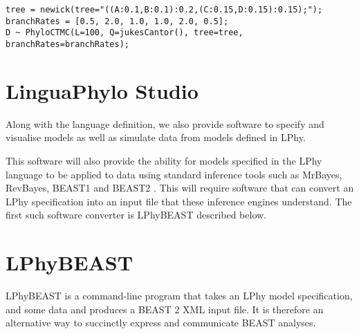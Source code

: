 \documentclass[oneside]{article}
\begin{document}
\begin{verbatim}
tree = newick(tree="((A:0.1,B:0.1):0.2,(C:0.15,D:0.15):0.15);");
branchRates = [0.5, 2.0, 1.0, 1.0, 2.0, 0.5];
D ~ PhyloCTMC(L=100, Q=jukesCantor(), tree=tree, branchRates=branchRates);
\end{verbatim}

\section{LinguaPhylo Studio}

Along with the language definition, we also provide software to
specify and visualise models as well as simulate data from models
defined in LPhy.

This software will also provide the ability for models specified in
the LPhy language to be applied to data using standard inference tools
such as MrBayes, RevBayes, BEAST1 and BEAST2
\cite{bouckaert2014beastanalysis,DrummondBouckaert2015,bouckaert2019beastanalysis}.
This will require software that can convert an LPhy specification into
an input file that these inference engines understand.
The first such software converter is LPhyBEAST described below.

\section{LPhyBEAST}

LPhyBEAST is a command-line program that takes an LPhy model
specification, and some data and produces a BEAST 2 XML input file.
It is therefore an alternative way to succinctly express and
communicate BEAST analyses.

%

\end{document}
